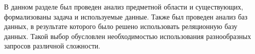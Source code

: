В данном разделе был проведен анализ предметной области и существующих, формализованы задача и используемые данные.
Также был проведен анализ баз данных, в результате которого было решено использовать реляционную базу данных.
Такой выбор обусловлен необходимостью использования разнообразных запросов различной сложности.
